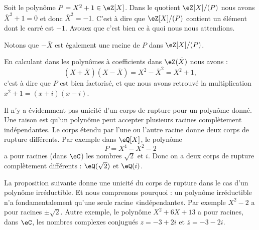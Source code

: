 \begin{example}
    Soit le polynôme \( P=X^2+1\in \eZ[X]\). Dans le quotient \( \eZ[X]/(P)\) nous avons \( \bar X^2+1=0\) et donc \( \bar X^2=-1\). C'est à dire que \( \eZ[X]/(P)\) contient un élément dont le carré est \( -1\). Avouez que c'est bien ce à quoi nous nous attendions.

    Notons que \( -\bar X\) est également une racine de \( P\) dans \( \eZ[X]/(P)\).

    En calculant dans les polynômes à coefficients dans \( \eZ(\bar X)\) nous avons :
    \begin{equation}
        (X+\bar X)(X-\bar X)=X^2-\bar X^2=X^2+1,
    \end{equation}
    c'est à dire que \( P\) est bien factorisé, et que nous avons retrouvé la multiplication \( x^2+1=(x+i)(x-i)\).
\end{example}

\begin{normaltext}
    Il n'y a évidemment pas unicité d'un corps de rupture pour un polynôme donné. Une raison est qu'un polynôme peut accepter plusieurs racines complètement indépendantes. Le corps étendu par l'une ou l'autre racine donne deux corps de rupture différents. Par exemple dans \( \eQ[X]\), le polynôme
    \begin{equation}
        P=X^4-X^2-2
    \end{equation}
    a pour racines (dans \( \eC\)) les nombres \( \sqrt{ 2 }\) et \( i\). Donc on a deux corps de rupture complètement différents : \( \eQ(\sqrt{ 2 })\) et \( \eQ(i)\).
\end{normaltext}

\begin{normaltext}
    La proposition suivante donne une unicité du corps de rupture dans le cas d'un polynôme irréductible. Et nous comprenons pourquoi : un polynôme irréductible n'a fondamentalement qu'une seule racine «indépendante». Par exemple \( X^2-2\) a pour racines \( \pm\sqrt{ 2 }\). Autre exemple, le polynôme \( X^2+6X+13\) a pour racines, dans \( \eC\), les nombres complexes conjugués \( z=-3+2i\) et \( \bar z=-3-2i\).
\end{normaltext}

